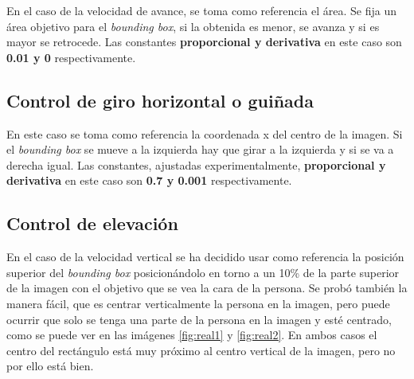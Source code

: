 En el caso de la velocidad de avance, se toma como referencia el área. Se fija un área objetivo para el \textit{bounding box}, si la obtenida es menor, se avanza y si es mayor se retrocede. Las constantes \textbf{proporcional y derivativa} en este caso son \textbf{0.01 y 0} respectivamente.

\subsection*{Control de giro horizontal o guiñada}

En este caso se toma como referencia la coordenada x del centro de la imagen. Si el \textit{bounding box} se mueve a la izquierda hay que girar a la izquierda y si se va a derecha igual. Las constantes, ajustadas experimentalmente, \textbf{proporcional y derivativa} en este caso son \textbf{0.7 y 0.001} respectivamente.

\subsection*{Control de elevación}
En el caso de la velocidad vertical se ha decidido usar como referencia la posición superior del \textit{bounding box} posicionándolo en torno a un 10\% de la parte superior de la imagen con el objetivo que se vea la cara de la persona. Se probó también la manera fácil, que es centrar verticalmente la persona en la imagen, pero puede ocurrir que solo se tenga una parte de la persona  en la imagen y esté centrado, como se puede ver en las imágenes \ref{fig:real1} y \ref{fig:real2}. En ambos casos el centro del rectángulo está muy próximo al centro vertical de la imagen, pero no por ello está bien.

